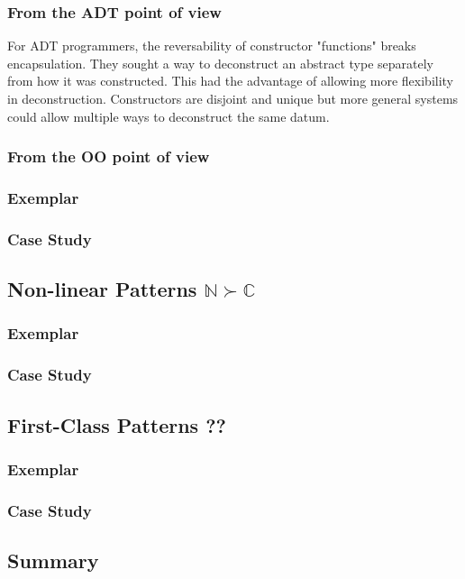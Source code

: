 \documentclass[acmsmall]{acmart}
\begin{document}
\subsubsection{From the ADT point of view}
For ADT programmers, the reversability of constructor "functions" breaks encapsulation.  They sought a way to deconstruct an abstract type separately from how it was constructed.  This had the advantage of allowing more flexibility in deconstruction. Constructors are disjoint and unique but more general systems could allow multiple ways to deconstruct the same datum.  

\subsubsection{From the OO point of view}

\subsubsection{Exemplar}
\subsubsection{Case Study}

\subsection{Non-linear Patterns $\mathbb{N} \succ \mathbb{C}$}
\label{sec:non-linear}
\subsubsection{Exemplar}
\subsubsection{Case Study}

\subsection{First-Class Patterns ??}
\label{sec:first-class}
\subsubsection{Exemplar}
\subsubsection{Case Study}

\subsection{Summary}
\end{document}
